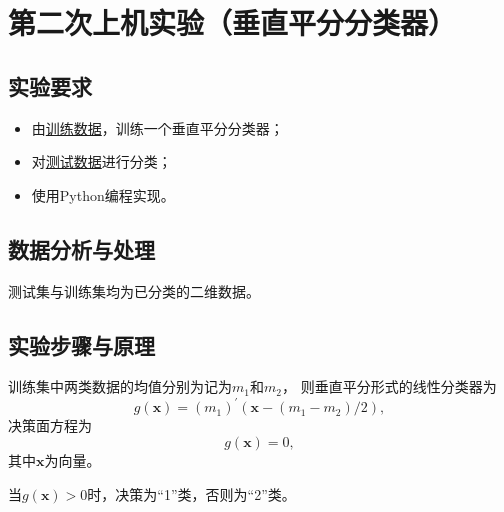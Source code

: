 \documentclass[a4paper,12pt]{report}
\begin{document}
\chapter{第二次上机实验（垂直平分分类器）}
\section{实验要求}
\begin{itemize}
    \item 由\href{https://github.com/mercier111/Data_mining_2021/blob/main/data/2021_0325/data/train.txt}{训练数据}，训练一个垂直平分分类器；
    \item 对\href{https://github.com/mercier111/Data_mining_2021/blob/main/data/2021_0325/data/test.txt}{测试数据}进行分类；
    \item 使用Python编程实现。
\end{itemize}
\section{数据分析与处理}
\par 测试集与训练集均为已分类的二维数据。
\section{实验步骤与原理}
训练集中两类数据的均值分别为记为$m_{1}$和$m_{2}$，
则垂直平分形式的线性分类器为
$$g(\boldsymbol{x})=(m_{1})^{\prime}(\boldsymbol{x}-(m_{1}-m_{2})/2),$$
决策面方程为$$g(\boldsymbol{x})=0,$$
其中$\boldsymbol{x}$为向量。
\par 当$g(\boldsymbol{x})>0$时，决策为“1”类，否则为“2”类。
\end{document}
